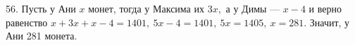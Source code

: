 56. Пусть у Ани $x$ монет, тогда у Максима их $3x,$ а у Димы --- $x-4$ и верно равенство $x+3x+x-4=1401,\ 5x-4=1401,\ 5x=1405,\ x=281.$ Значит, у Ани 281 монета.\\

